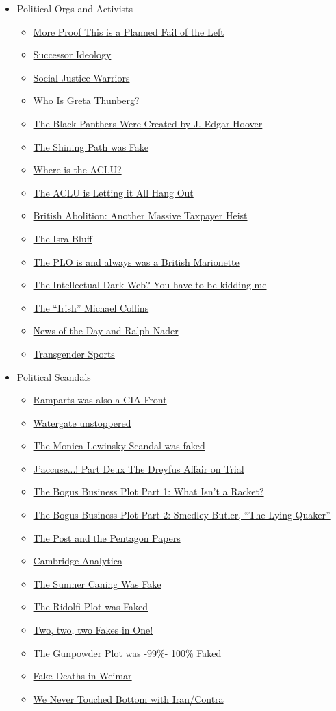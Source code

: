 \documentclass{article}
\newcommand{\insertmydocument}[2]{ %
  \item \href{http://www.mileswmathis.com/#2}{#1}
}
\begin{document}
\begin{itemize}
\begin{itemize}
\begin{itemize}
    \end{itemize}

    \item Political Orgs and Activists
    \begin{itemize}

      \insertmydocument{More Proof This is a Planned Fail of the Left}{pedo.pdf}
      \insertmydocument{Successor Ideology}{sideol.pdf}
      \insertmydocument{Social Justice Warriors}{sjw.pdf}
      \insertmydocument{Who Is Greta Thunberg?}{greta.pdf}
      \insertmydocument{The Black Panthers Were Created by J. Edgar Hoover}{panther.pdf}
      \insertmydocument{The Shining Path was Fake}{shining.pdf}
      \insertmydocument{Where is the ACLU?}{aclu.pdf}
      \insertmydocument{The ACLU is Letting it All Hang Out}{aclu2.pdf}
      \insertmydocument{British Abolition: Another Massive Taxpayer Heist}{wilber.pdf}
      \insertmydocument{The Isra-Bluff}{israbluff2.pdf}
      \insertmydocument{The PLO is and always was a British Marionette}{plo.pdf}
      \insertmydocument{The Intellectual Dark Web? You have to be kidding me}{darkweb.pdf}
      \insertmydocument{The “Irish” Michael Collins}{collins2.pdf}
      \insertmydocument{News of the Day and Ralph Nader}{ban.pdf}
      \insertmydocument{Transgender Sports}{upenn.pdf}
    \end{itemize}

    \item Political Scandals
    \begin{itemize}

      \insertmydocument{Ramparts was also a CIA Front}{ramp.pdf}
      \insertmydocument{Watergate unstoppered}{watergate.pdf}
      \insertmydocument{The Monica Lewinsky Scandal was faked}{lewin.pdf}
      \insertmydocument{J’accuse...! Part Deux The Dreyfus Affair on Trial}{dreyfus.pdf}
      \insertmydocument{The Bogus Business Plot Part 1: What Isn’t a Racket?}{butler.pdf}
      \insertmydocument{The Bogus Business Plot Part 2: Smedley Butler, “The Lying Quaker”}{butler2.pdf}
      \insertmydocument{The Post and the Pentagon Papers}{post.pdf}
      \insertmydocument{Cambridge Analytica}{anal.pdf}
      \insertmydocument{The Sumner Caning Was Fake}{sumner.pdf}
      \insertmydocument{The Ridolfi Plot was Faked}{ridolfi.pdf}
      \insertmydocument{Two, two, two Fakes in One!}{trask.pdf}
      \insertmydocument{The Gunpowder Plot was -99\%- 100\% Faked}{fawkes.pdf}
      \insertmydocument{Fake Deaths in Weimar}{weimar.pdf}
      \insertmydocument{We Never Touched Bottom with Iran/Contra}{beirut.pdf}
    \end{itemize}


\end{itemize}
\end{itemize}
\end{document}
